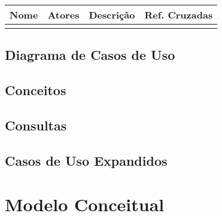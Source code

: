 \documentclass[12pt,a4paper]{article}
\begin{document}
	        		\begin{tabular}{|l|l|l|l|}
	        		\hline Nome & Atores & Descrição & Ref. Cruzadas \\ 
	        		\hline  &  &  &  \\ 
	        		\hline 
	        		\end{tabular} 
	        		
	        	\subsection{Diagrama de Casos de Uso}
	        	\subsection{Conceitos}
	        	\subsection{Consultas}
	        	\subsection{Casos de Uso Expandidos}
        	
        	\newpage
        	\section{Modelo Conceitual}
        	
        	
        	
\end{document}

